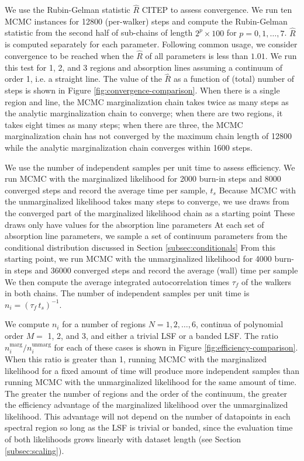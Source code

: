 \documentclass[manuscript]{aastex62}
\begin{document}
We use the Rubin-Gelman statistic $\hat{R}$ CITEP to assess convergence.
We run ten MCMC instances for 12800 (per-walker) steps and compute the Rubin-Gelman statistic from the second half of sub-chains of length $2^p \times 100$ for $p=0, 1, \ldots, 7$.
$\hat{R}$ is computed separately for each parameter.
Following common usage, we consider convergence to be reached when the $\hat{R}$ of all parameters is less than $1.01$.
We run this test for 1, 2, and 3 regions and absorption lines assuming a continuum of order 1, i.e. a straight line.
The value of the $\hat{R}$ as a function of (total) number of steps is shown in Figure \ref{fig:convergence-comparison}.
When there is a single region and line, the MCMC marginalization chain takes twice as many steps as the analytic marginalization chain to converge; when there are two regions, it takes eight times as many steps; when there are three, the MCMC marginalization  chain has not converged by the maximum chain length of 12800 while the analytic marginalization chain converges within 1600 steps.

We use the number of independent samples per unit time to assess efficiency.
We run MCMC with the marginalized likelihood for 2000 burn-in steps and 8000 converged steps and record the average time per sample, $t_s$
Because MCMC with the unmarginalized likelihood takes many steps to converge, we use draws from the converged part of the marginalized likelihood chain as a starting point
These draws only have values for the absorption line parameters
At each set of absorption line parameters, we sample a set of continuum parameters from the conditional distribution discussed in Section \ref{subsec:conditionals}
From this starting point, we run MCMC with the unmarginalized likelihood for 4000 burn-in steps and 36000 converged steps and record the average (wall) time per sample
We then compute the average integrated autocorrelation times $\tau_f$ of the walkers in both chains.
The number of independent samples per unit time is $n_i = \left(\tau_f \, t_s \right)^{-1}$.

We compute $n_i$ for a number of regions $N = 1, 2, \ldots, 6$, continua of polynomial order $M=$ 1, 2, and 3, and either a trivial LSF or a banded LSF.
The ratio $n_i^{\text{marg}} / n_i^{\text{unmarg}}$ for each of these cases is shown in Figure \ref{fig:efficiency-comparison}.
When this ratio is greater than 1, running MCMC with the marginalized likelihood for a fixed amount of time will produce more independent samples than running MCMC with the unmarginalized likelihood for the same amount of time.
The greater the number of regions and the order of the continuum, the greater the efficiency advantage of the marginalized likelihood over the unmarginalized likelihood.
This advantage will not depend on the number of datapoints in each spectral region so long as the LSF is trivial or banded, since the evaluation time of both likelihoods grows linearly with dataset length (see Section \ref{subsec:scaling}).
\end{document}
